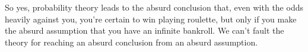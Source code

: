 So yes, probability theory leads to the absurd conclusion that, even
with the odds heavily against you, you're certain to win playing
roulette, but only if you make the absurd assumption that you have an
infinite bankroll.  We can't fault the theory for reaching an absurd
conclusion from an absurd assumption.


\begin{problems}
\practiceproblems
{}

\classproblems
{}

\examproblems
{}
\end{problems}

\endinput

